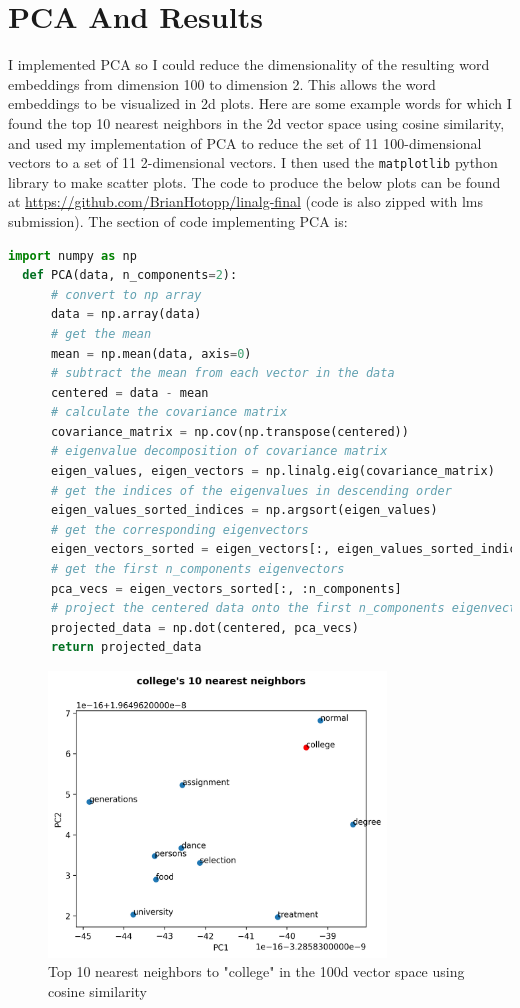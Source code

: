 \documentclass[12pt,letterpaper]{article}
\begin{document}
\section{PCA And Results}
I implemented PCA so I could reduce the dimensionality of the resulting word embeddings from dimension 100 to dimension 2. This allows the word embeddings to be visualized in 2d plots. Here are some example words for which I found the top 10 nearest neighbors in the 2d vector space using cosine similarity, and used my implementation of PCA to reduce the set of 11 100-dimensional vectors to a set of 11 2-dimensional vectors. I then used the \texttt{matplotlib} python library to make scatter plots.
The code to produce the below plots can be found at \url{https://github.com/BrianHotopp/linalg-final} (code is also zipped with lms submission).
The section of code implementing PCA is:
\begin{lstlisting}[language=Python]
  import numpy as np
  def PCA(data, n_components=2):
      # convert to np array
      data = np.array(data)
      # get the mean
      mean = np.mean(data, axis=0)
      # subtract the mean from each vector in the data
      centered = data - mean
      # calculate the covariance matrix
      covariance_matrix = np.cov(np.transpose(centered))
      # eigenvalue decomposition of covariance matrix
      eigen_values, eigen_vectors = np.linalg.eig(covariance_matrix)
      # get the indices of the eigenvalues in descending order
      eigen_values_sorted_indices = np.argsort(eigen_values)
      # get the corresponding eigenvectors
      eigen_vectors_sorted = eigen_vectors[:, eigen_values_sorted_indices]
      # get the first n_components eigenvectors
      pca_vecs = eigen_vectors_sorted[:, :n_components]
      # project the centered data onto the first n_components eigenvectors
      projected_data = np.dot(centered, pca_vecs)
      return projected_data
\end{lstlisting}
\begin{figure}[H]
\begin{center}
  \includegraphics[width=0.8\textwidth]{../graphs/college_neighbors.png}
\end{center}
\caption{Top 10 nearest neighbors to "college" in the 100d vector space using cosine similarity}
\end{figure}
\end{document}
